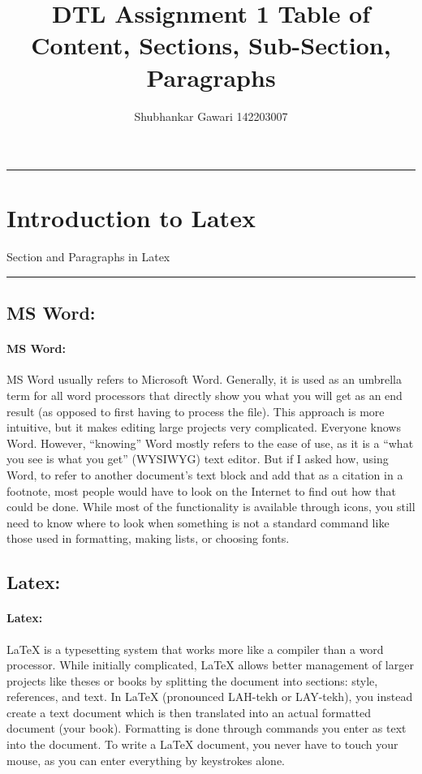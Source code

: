 \documentclass[a4paper,12pt,oneside,article]{article}
\title{DTL Assignment 1 Table of Content, Sections, Sub-Section, Paragraphs}
\author{Shubhankar Gawari 142203007}
\begin{document}
\maketitle
\newpage


\hrule

\tableofcontents 



\newpage

\section{Introduction to Latex}
Section and Paragraphs 
in Latex

\newline

\hrule
	
\subsection{MS Word:}
\paragraph{MS Word:}
MS Word usually refers to Microsoft Word. Generally, it is used as an umbrella term for all word processors that directly show you what you will get as an end result (as opposed to first having to process the file). This approach is more intuitive, but it makes editing large projects very complicated. Everyone knows Word. However, “knowing” Word mostly refers to the ease of use, as it is a “what you see is what you get” (WYSIWYG) text editor. But if I asked how, using Word, to refer to another document’s text block and add that as a citation in a footnote, most people would have to look on the Internet to find out how that could be done. While most of the functionality is available through icons, you still need to know where to look when something is not a standard command like those used in formatting, making lists, or choosing fonts.

\subsection{Latex: }
\paragraph{Latex:}

 LaTeX is a typesetting system that works more like a compiler than a word processor. While initially complicated, LaTeX allows better management of larger projects like theses or books by splitting the document into sections: style, references, and text. In LaTeX (pronounced LAH-tekh or LAY-tekh), you instead create a text document which is then translated into an actual formatted document (your book). Formatting is done through commands you enter as text into the document. To write a LaTeX document, you never have to touch your mouse, as you can enter everything by keystrokes alone.
\end{document}
